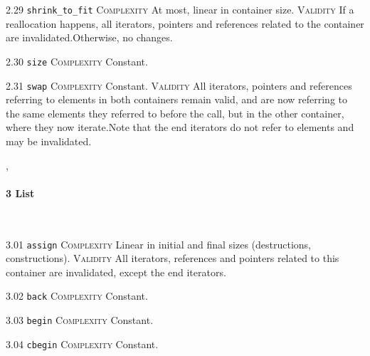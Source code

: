 \noindent\textcolor{corange}{2.29 \texttt{shrink\_to\_fit}} \textsc{Complexity} At most, linear in container size. \textsc{Validity} If a reallocation happens, all iterators, pointers and references related to the container are invalidated.Otherwise, no changes.\vspace{0.5em}

\noindent\textcolor{cgreen}{2.30 \texttt{size}} \textsc{Complexity} Constant. \vspace{0.5em}

\noindent\textcolor{cgreen}{2.31 \texttt{swap}} \textsc{Complexity} Constant. \textsc{Validity} All iterators, pointers and references referring to elements in both containers remain valid, and are now referring to the same elements they referred to before the call, but in the other container, where they now iterate.Note that the end iterators do not refer to elements and may be invalidated.\vspace{0.5em}


\sep
{}
\paragraph{3 List}\mbox{}\\
\noindent\textcolor{corange}{3.01 \texttt{assign}} \textsc{Complexity} Linear in initial and final sizes (destructions, constructions). \textsc{Validity} All iterators, references and pointers related to this container are invalidated, except the end iterators.\vspace{0.5em}

\noindent\textcolor{cgreen}{3.02 \texttt{back}} \textsc{Complexity} Constant. \vspace{0.5em}

\noindent\textcolor{cgreen}{3.03 \texttt{begin}} \textsc{Complexity} Constant. \vspace{0.5em}

\noindent\textcolor{cgreen}{3.04 \texttt{cbegin}} \textsc{Complexity} Constant. \vspace{0.5em}

